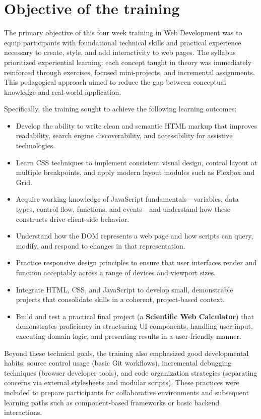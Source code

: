 \documentclass[a4paper,12pt,oneside]{report}
\numberwithin{equation}{chapter}
\numberwithin{figure}{chapter}
\numberwithin{table}{chapter}
\begin{document}
\section{Objective of the training}

The primary objective of this four week training in Web Development was to equip participants with foundational technical skills and practical experience necessary to create, style, and add interactivity to web pages. The syllabus prioritized experiential learning: each concept taught in theory was immediately reinforced through exercises, focused mini-projects, and incremental assignments. This pedagogical approach aimed to reduce the gap between conceptual knowledge and real-world application.

Specifically, the training sought to achieve the following learning outcomes:

\begin{itemize}
    \item Develop the ability to write clean and semantic HTML markup that improves readability, search engine discoverability, and accessibility for assistive technologies.
    \item Learn CSS techniques to implement consistent visual design, control layout at multiple breakpoints, and apply modern layout modules such as Flexbox and Grid.
    \item Acquire working knowledge of JavaScript fundamentals—variables, data types, control flow, functions, and events—and understand how these constructs drive client-side behavior.
    \item Understand how the DOM represents a web page and how scripts can query, modify, and respond to changes in that representation.
    \item Practice responsive design principles to ensure that user interfaces render and function acceptably across a range of devices and viewport sizes.
    \item Integrate HTML, CSS, and JavaScript to develop small, demonstrable projects that consolidate skills in a coherent, project-based context.
    \item Build and test a practical final project (a \textbf{Scientific Web Calculator}) that demonstrates proficiency in structuring UI components, handling user input, executing domain logic, and presenting results in a user-friendly manner.
\end{itemize}

Beyond these technical goals, the training also emphasized good developmental habits: source control usage (basic Git workflows), incremental debugging techniques (browser developer tools), and code organization strategies (separating concerns via external stylesheets and modular scripts). These practices were included to prepare participants for collaborative environments and subsequent learning paths such as component-based frameworks or basic backend interactions.
\end{document}
